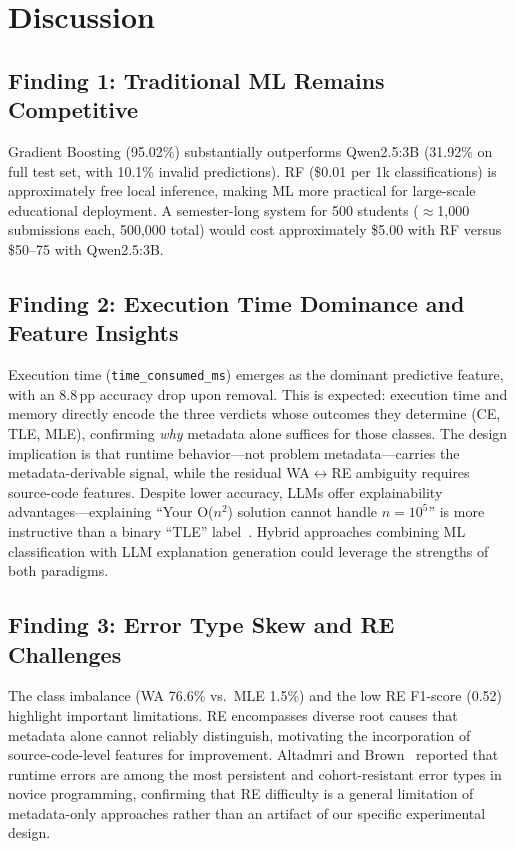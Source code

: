 \documentclass[acmsmall]{acmart}
\begin{document}
\section{Discussion}

\subsection{Finding 1: Traditional ML Remains Competitive}

Gradient Boosting (95.02\%) substantially outperforms Qwen2.5:3B
(31.92\% on full test set, with 10.1\% invalid predictions). RF (\$0.01 per
1k classifications) is
approximately free local inference, making ML
more practical for large-scale educational deployment. A semester-long system
for 500 students ($\approx$1,000 submissions each, 500,000 total) would cost approximately \$5.00 with RF versus \$50--75
with Qwen2.5:3B.

\subsection{Finding 2: Execution Time Dominance and Feature Insights}

Execution time (\texttt{time\_consumed\_ms}) emerges as the dominant
predictive feature, with an 8.8\,pp accuracy drop upon removal. This is
expected: execution time and memory directly encode the three
verdicts whose outcomes they determine (CE, TLE, MLE), confirming \emph{why}
metadata alone suffices for those classes. The design implication is that
runtime behavior---not problem metadata---carries the metadata-derivable
signal, while the residual WA$\leftrightarrow$RE ambiguity requires
source-code features. Despite lower accuracy, LLMs offer explainability
advantages---explaining ``Your O($n^2$) solution cannot handle $n = 10^5$'' is
more instructive than a binary ``TLE'' label~\cite{finnie2022robots}. Hybrid
approaches combining ML classification with LLM explanation generation could
leverage the strengths of both paradigms.

\subsection{Finding 3: Error Type Skew and RE Challenges}

The class imbalance (WA 76.6\% vs.\ MLE 1.5\%) and the low RE F1-score (0.52)
highlight important limitations. RE encompasses diverse root causes that
metadata alone cannot reliably distinguish, motivating the incorporation of
source-code-level features for improvement. Altadmri and Brown~\cite{altadmri2015most} reported that runtime errors are
among the most persistent and cohort-resistant error types in novice
programming, confirming that RE difficulty is a general limitation of
metadata-only approaches rather than an artifact of our specific
experimental design.
\end{document}
